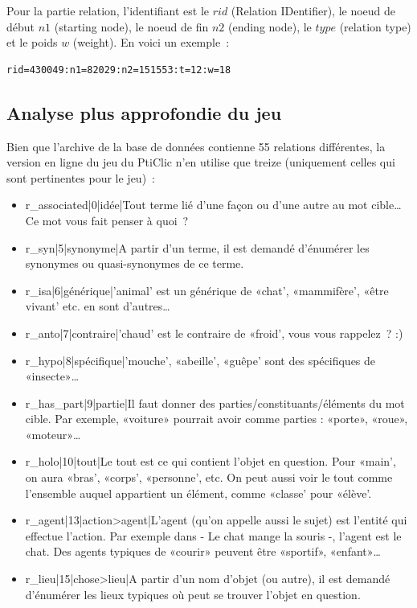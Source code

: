 \documentclass[a4paper,11pt,french]{article}
\begin{document}
Pour la partie relation, l'identifiant est le $rid$ (Relation IDentifier), le noeud de début $n1$ (starting node), le noeud de fin $n2$ (ending node), le $type$ (relation type) et le poids $w$ (weight). En voici un exemple~:
\begin{verbatim}
rid=430049:n1=82029:n2=151553:t=12:w=18
\end{verbatim}

\subsection{Analyse plus approfondie du jeu}
Bien que l'archive de la base de données contienne 55 relations différentes, la version en ligne du jeu du PtiClic n'en utilise que treize (uniquement celles qui sont pertinentes pour le jeu)~:

\begin{itemize}
\item r\_associated|0|idée|Tout terme lié d'une façon ou d'une autre au mot cible\dots{} Ce mot vous fait penser à quoi~? 
\item r\_syn|5|synonyme|A partir d'un terme, il est demandé d'énumérer les synonymes ou quasi-synonymes de ce terme. \item r\_isa|6|générique|'animal' est un générique de «chat', «mammifère', «être vivant' etc. en sont d'autres\dots{}
\item r\_anto|7|contraire|'chaud' est le contraire de «froid', vous vous rappelez~? :)
\item r\_hypo|8|spécifique|'mouche', «abeille', «guêpe' sont des spécifiques de «insecte»\dots{}
\item r\_has\_part|9|partie|Il faut donner des parties/constituants/éléments du mot cible. Par exemple, «voiture» pourrait avoir comme parties : «porte», «roue», «moteur»\dots{}
\item r\_holo|10|tout|Le tout est ce qui contient l'objet en question. Pour «main', on aura «bras', «corps', «personne', etc. On peut aussi voir le tout comme l'ensemble auquel appartient un élément, comme «classe' pour «élève'.
\item r\_agent|13|action>agent|L'agent (qu'on appelle aussi le sujet) est l'entité qui effectue l'action. Par exemple dans - Le chat mange la souris -, l'agent est le chat. Des agents typiques de «courir» peuvent être «sportif», «enfant»\dots{} 
\item r\_lieu|15|chose>lieu|A partir d'un nom d'objet (ou autre), il est demandé d'énumérer les lieux typiques où peut se trouver l'objet en question.

\end{itemize}
\end{document}
